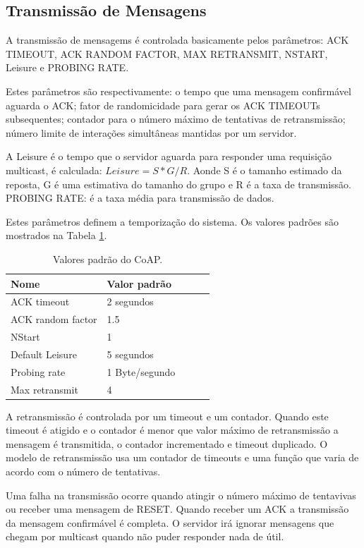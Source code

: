 \subsection{Transmiss\~ao de Mensagens}
A transmiss\~ao de mensagems \'e controlada basicamente pelos par\^ametros: ACK TIMEOUT, ACK RANDOM FACTOR, MAX RETRANSMIT, NSTART, Leisure e PROBING RATE.

Estes par\^ametros s\~ao respectivamente: o tempo que uma mensagem confirm\'avel aguarda o ACK; fator de randomicidade para gerar os ACK TIMEOUTs subsequentes; contador para o n\'umero m\'aximo de tentativas de retransmiss\~ao; n\'umero limite de intera\c{c}\~oes simult\^aneas mantidas por um servidor.

A Leisure \'e o tempo que o servidor aguarda para responder uma requisi\c{c}\~ao multicast, \'e calculada: $Leisure = S * G / R$. Aonde S \'e o tamanho estimado da reposta, G \'e uma estimativa do tamanho do grupo e R \'e a taxa de transmiss\~ao. PROBING RATE: \'e a taxa m\'edia para transmiss\~ao de dados.

    Estes par\^ametros definem a temporiza\c{c}\~ao do sistema. Os valores padr\~oes s\~ao mostrados na Tabela \ref{coapDefault}.
\begin{table}[h]
\label{coapDefault}
\centering
\begin{tabular}{@{}lllll@{}}
\toprule
Nome & Valor padr\~ao & \\ \midrule
ACK timeout & 2 segundos & \\
ACK random factor & 1.5 & \\
NStart & 1 & \\
Default Leisure & 5 segundos & \\
Probing rate & 1 Byte/segundo & \\
Max retransmit & 4 &  \\ \midrule
\end{tabular}
\caption{Valores padr\~ao do CoAP.}
\end{table}

A retransmiss\~ao \'e controlada por um timeout e um contador. Quando este timeout \'e atigido e o contador \'e menor que valor m\'aximo de retransmiss\~ao a mensagem \'e transmitida, o contador incrementado e timeout duplicado. O modelo de retransmiss\~ao usa um contador de timeouts e uma fun\c{c}\~ao que varia de acordo com o n\'umero de tentativas.

Uma falha na transmiss\~ao ocorre quando atingir o n\'umero m\'aximo de tentavivas ou receber uma mensagem de RESET. Quando receber um ACK a transmiss\~ao da mensagem confirm\'avel \'e completa. O servidor ir\'a ignorar mensagens que chegam por multicast quando n\~ao puder responder nada de \'util.

